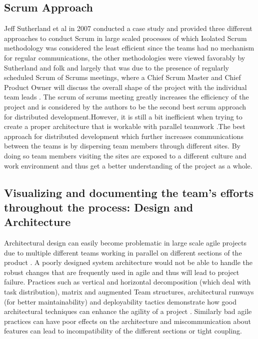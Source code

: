 \documentclass[sigplan,screen]{acmart}
\begin{document}
\subsection{Scrum Approach}
Jeff Sutherland et al in 2007 conducted a case study and provided three different approaches to conduct Scrum in large scaled processes of which Isolated Scrum methodology was considered the least efficient since the teams had no mechanism for regular communications, the other methodologies were viewed favorably by Sutherland and folk and largely that was due to the presence of regularly scheduled Scrum of Scrums meetings, where a Chief Scrum Master and Chief Product Owner will discuss the overall shape of the project with the individual team leads \cite{Jeff}. The scrum of scrums meeting greatly increases the efficiency of the project and is considered by the authors to be the second best scrum approach for distributed development.However, it is still a bit inefficient when trying to create a proper architecture that is workable with parallel teamwork \cite{Dingsoyr}.The best approach for distributed development which further increases communications between the teams is by dispersing team members through different sites. By doing so team members visiting the sites are exposed to a different culture and work environment and thus get a better understanding of the project as a whole.

\subsection{Visualizing and documenting the team's efforts throughout the process: Design and Architecture}

Architectural design can easily become problematic in large scale agile projects due to multiple different teams working in parallel on 
different sections of the product \cite{Dingsoyr}. A poorly designed system architecture would not be able to handle the
 robust changes that are frequently used in agile and thus will lead to project failure. Practices such as vertical and 
 horizontal decomposition (which deal with task distribution), matrix and augmented Team structures,
 architectural runways (for better maintainability) and deployability tactics demonstrate how good architectural techniques can enhance the agility of a project \cite{Nord}. Similarly bad agile practices can have poor effects on the architecture and miscommunication 
 about features can lead to incompatibility of the different sections or tight coupling. 
\end{document}
